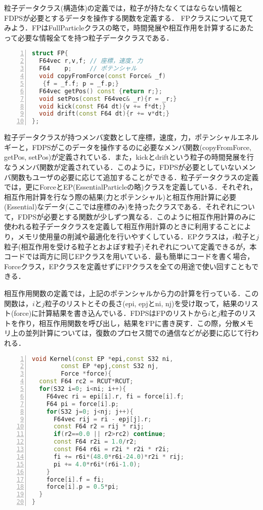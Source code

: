 \documentclass[twocolumn,10pt]{jarticle}
\begin{document}
  粒子データクラス(構造体)の定義では，粒子が持たなくてはならない情報とFDPSが必要とするデータを操作する関数を定義する．
FPクラスについて見てみよう．FPはFullParticleクラスの略で，時間発展や相互作用を計算するにあたって必要な情報全てを持つ粒子データクラスである．
\begin{lstlisting}[language=c++,numbers=left,numbersep=5pt,frame=single,basicstyle=\ttfamily]
struct FP{
  F64vec r,v,f; // 座標，速度，力
  F64    p;     // ポテンシャル
  void copyFromForce(const Force& _f)
   {f = _f.f; p = _f.p;}
  F64vec getPos() const {return r;};
  void setPos(const F64vec& _r){r = _r;}
  void kick(const F64 dt){v += f*dt;}
  void drift(const F64 dt){r += v*dt;}
};
\end{lstlisting}
粒子データクラスが持つメンバ変数として座標，速度，力，ポテンシャルエネルギーと，FDPSがこのデータを操作するのに必要なメンバ関数(copyFromForce, getPos, setPos)が定義されている．また，kickとdriftという粒子の時間発展を行なうメンバ関数が定義されている．このように，FDPSが必要としていないメンバ関数もユーザの必要に応じて追加することができる．粒子データクラスの定義では，更にForceとEP(EssentialParticleの略)クラスを定義している．それぞれ，相互作用計算を行なう際の結果(力とポテンシャル)と相互作用計算に必要(Essential)なデータ(ここでは座標のみ)を持ったクラスである．それぞれについて，FDPSが必要とする関数が少しずつ異なる．このように相互作用計算のみに使われる粒子データクラスを定義して相互作用計算のときに利用することにより，メモリ使用量の削減や最適化を行いやすくしている．EPクラスは，$i$粒子と$j$粒子(相互作用を受ける粒子とおよぼす粒子)それぞれについて定義できるが，本コードでは両方に同じEPクラスを用いている．最も簡単にコードを書く場合，Forceクラス，EPクラスを定義せずにFPクラスを全ての用途で使い回すこともできる．

相互作用関数の定義では，上記のポテンシャルから力の計算を行っている．この関数は，$i$と$j$粒子のリストとその長さ(epi, epjとni, nj)を受け取って，結果のリスト(force)に計算結果を書き込んでいる．FDPSはFPのリストから$i$と$j$粒子のリストを作り，相互作用関数を呼び出し，結果をFPに書き戻す．この際，分散メモリ上の並列計算については，復数のプロセス間での通信などが必要に応じて行われる．
\begin{lstlisting}[language=c++,numbers=left,numbersep=5pt,frame=single,basicstyle=\ttfamily]
void Kernel(const EP *epi,const S32 ni,
	    const EP *epj,const S32 nj,
	    Force *force){
  const F64 rc2 = RCUT*RCUT;
  for(S32 i=0; i<ni; i++){
    F64vec ri = epi[i].r, fi = force[i].f;
    F64 pi = force[i].p;
    for(S32 j=0; j<nj; j++){
      F64vec rij = ri - epj[j].r;
      const F64 r2 = rij * rij;
      if(r2==0.0 || r2>rc2) continue;
      const F64 r2i = 1.0/r2;
      const F64 r6i = r2i * r2i * r2i;
      fi += r6i*(48.0*r6i-24.0)*r2i * rij;
      pi += 4.0*r6i*(r6i-1.0);
    }
    force[i].f = fi;
    force[i].p = 0.5*pi;
  }
}
\end{lstlisting}
\end{document}
